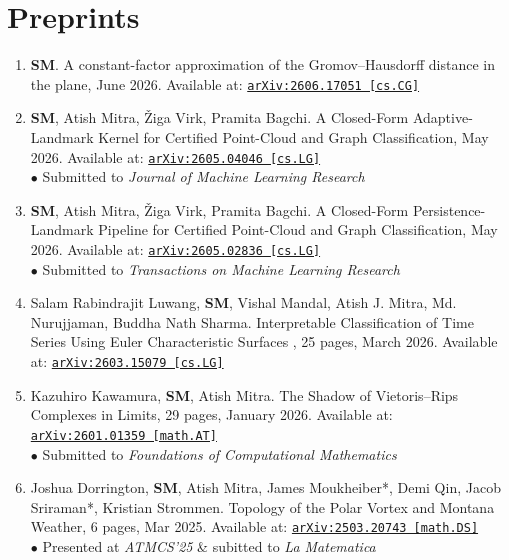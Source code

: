 \documentclass[11pt]{article}
\begin{document}
\section{Preprints}
\begin{enumerate}
\item[9.] \textbf{SM}. A constant-factor approximation of the Gromov--Hausdorff distance in the plane, June 2026.
Available at:
\href{https://arxiv.org/abs/2606.17051}{\tt arXiv:2606.17051 [cs.CG]}

\item[8.] \textbf{SM}, Atish Mitra, \v{Z}iga Virk, Pramita Bagchi. A Closed-Form Adaptive-Landmark Kernel for Certified Point-Cloud and Graph Classification, May 2026.
Available at:
\href{https://arxiv.org/abs/2605.04046}{\tt arXiv:2605.04046 [cs.LG]}\\
$\bullet$ Submitted to \emph{Journal of Machine Learning Research}

\item[7.] \textbf{SM}, Atish Mitra, \v{Z}iga Virk, Pramita Bagchi. A Closed-Form Persistence-Landmark Pipeline for Certified Point-Cloud and Graph Classification, May 2026.
Available at:
\href{https://arxiv.org/abs/2605.02836}{\tt arXiv:2605.02836 [cs.LG]}\\
$\bullet$ Submitted to \emph{Transactions on Machine Learning Research}

\item[6.] Salam Rabindrajit Luwang, \textbf{SM}, Vishal Mandal, Atish J. Mitra, Md. Nurujjaman, Buddha Nath Sharma. Interpretable Classification of Time Series Using Euler Characteristic Surfaces
, 25 pages, March 2026.
Available at:
\href{https://arxiv.org/abs/2603.15079}{\tt 	arXiv:2603.15079 [cs.LG]}

\item[5.] Kazuhiro Kawamura, \textbf{SM}, Atish Mitra. The Shadow of Vietoris–Rips Complexes in Limits, 29 pages, January 2026.
Available at:
\href{https://arxiv.org/abs/2601.01359}{\tt arXiv:2601.01359 [math.AT]}\\
$\bullet$ Submitted to \emph{Foundations of Computational Mathematics}

\item[4.] Joshua Dorrington, \textbf{SM}, Atish Mitra, James Moukheiber*, Demi Qin, Jacob Sriraman*, Kristian Strommen. Topology of the Polar Vortex and Montana Weather, 6 pages, Mar 2025.
Available at:
\href{https://arxiv.org/abs/2503.20743}{\tt arXiv:2503.20743 [math.DS]}\\
$\bullet$ Presented at \emph{ATMCS'25} \& subitted to \emph{La Matematica}


\end{enumerate}
\end{document}
